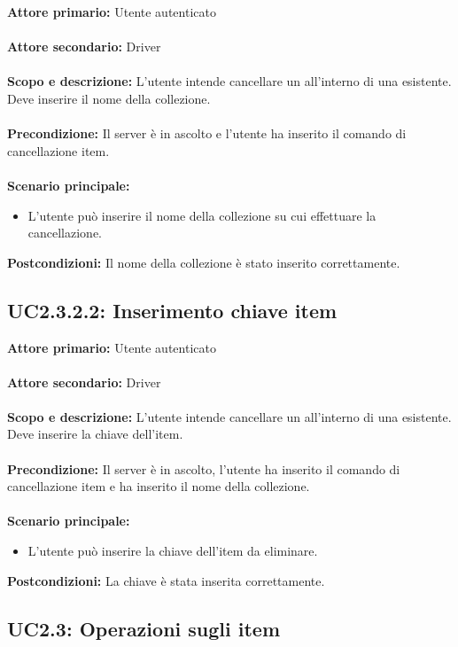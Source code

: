 \documentclass{scalatekids-article}
\begin{document}
\textbf{Attore primario:} Utente autenticato\\ \\
\textbf{Attore secondario:} Driver\\ \\
\textbf{Scopo e descrizione:} L'utente intende cancellare un  all'interno di una  esistente. Deve inserire il nome della collezione.\\ \\
\textbf{Precondizione:} Il server è in ascolto e l'utente ha inserito il comando di cancellazione item.\\ \\
\textbf{Scenario principale:}
\begin{itemize}
  \item L'utente può inserire il nome della collezione su cui effettuare la cancellazione.
\end{itemize}
\textbf{Postcondizioni:} Il nome della collezione è stato inserito correttamente.

\subsection{UC2.3.2.2: Inserimento chiave item}

\textbf{Attore primario:} Utente autenticato\\ \\
\textbf{Attore secondario:} Driver\\ \\
\textbf{Scopo e descrizione:} L'utente intende cancellare un  all'interno di una  esistente. Deve inserire la chiave dell'item.\\ \\
\textbf{Precondizione:} Il server è in ascolto, l'utente ha inserito il comando di cancellazione item e ha inserito il nome della collezione.\\ \\
\textbf{Scenario principale:}
\begin{itemize}
  \item L'utente può inserire la chiave dell'item da eliminare.
\end{itemize}
\textbf{Postcondizioni:} La chiave è stata inserita correttamente.

\iffalse \subsection{UC2.3: Operazioni sugli item}
\end{document}

